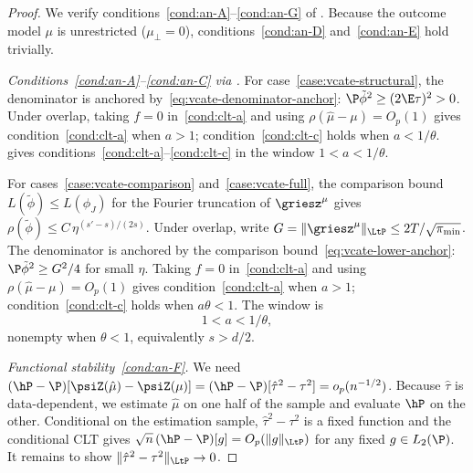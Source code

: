 \documentclass{article}
\begin{document}
\begin{proof}
We verify conditions~\ref{cond:an-A}--\ref{cond:an-G} of
.
Because the outcome model $\mu$ is unrestricted
($\mu_\perp = 0$),
conditions~\ref{cond:an-D} and~\ref{cond:an-E} hold trivially.

\emph{Conditions~\ref{cond:an-A}--\ref{cond:an-C}
  via .}
For case~\ref{case:vcate-structural},
the denominator is anchored
by~\eqref{eq:vcate-denominator-anchor}:
$\P\tilde\phi^2 \ge (2\E\tau)^2 > 0$.
Under overlap,
taking $f = 0$ in~\ref{cond:clt-a}
and using $\rho(\hat\mu - \mu) = O_p(1)$
gives condition~\ref{cond:clt-a} when $a > 1$;
condition~\ref{cond:clt-c} holds when $a < 1/\theta$.
 gives
conditions~\ref{cond:clt-a}--\ref{cond:clt-c}
in the window $1 < a < 1/\theta$.

For cases~\ref{case:vcate-comparison}
and~\ref{case:vcate-full},
the comparison bound
$L(\tilde\phi) \le L(\phi_J)$
for the Fourier truncation of $\griesz^\mu$
gives $\rho(\tilde\phi) \le C\,\eta^{(s'-s)/(2s)}$.
Under overlap,
write $G = \|\griesz^\mu\|_{\LtP}
  \le 2T/\sqrt{\pi_{\min}}$.
The denominator is anchored
by the comparison bound~\eqref{eq:vcate-lower-anchor}:
$\P\tilde\phi^2 \ge G^2/4$
for small $\eta$.
Taking $f = 0$ in~\ref{cond:clt-a}
and using $\rho(\hat\mu - \mu) = O_p(1)$
gives condition~\ref{cond:clt-a} when $a > 1$;
condition~\ref{cond:clt-c} holds when $a\theta < 1$.
The window is
\begin{equation}\label{eq:vcate-lambda-window}
1 < a < 1/\theta,
\end{equation}
nonempty when $\theta < 1$,
equivalently $s > d/2$.

\emph{Functional stability~\ref{cond:an-F}.}
We need
$(\hP - \P)[\psiZ(\hat\mu) - \psiZ(\mu)]
  = (\hP - \P)[\hat\tau^2 - \tau^2]
  = o_p(n^{-1/2})$.
Because $\hat\tau$ is data-dependent,
we estimate $\hat\mu$ on one half of the sample
and evaluate $\hP$ on the other.
Conditional on the estimation sample,
$\hat\tau^2 - \tau^2$ is a fixed function
and the conditional CLT gives
$\sqrt{n}\,(\hP - \P)[g]
  = O_p(\|g\|_{\LtP})$
for any fixed $g \in L_2(\P)$.
It remains to show
$\|\hat\tau^2 - \tau^2\|_{\LtP} \to 0$.


\end{proof}
\end{document}
